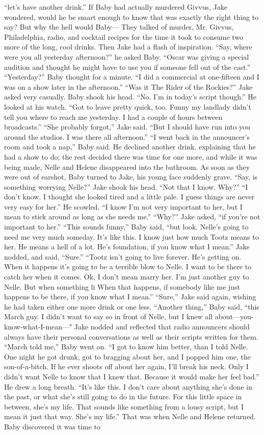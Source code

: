 \documentclass{novel}
\begin{document}
“let’s have another drink.” If Baby had actually murdered Givvus, Jake wondered, would he be smart enough to know that was exactly the right thing to say? But why the hell would Baby— They talked of murder, Mr. Givvus, Philadelphia, radio, and cocktail recipes for the time it took to consume two more of the long, cool drinks. Then Jake had a flash of inspiration. “Say, where were you all yesterday afternoon?” he asked Baby. “Oscar was giving a special audition and thought he might have to use you if someone fell out of the cast.” “Yesterday?” Baby thought for a minute. “I did a commercial at one-fifteen and I was on a show later in the afternoon.” “Was it The Rider of the Rockies?” Jake asked very casually. Baby shook his head. “No. I’m in today’s script though.” He looked at his watch. “Got to leave pretty quick, too. Funny my landlady didn’t tell you where to reach me yesterday. I had a couple of hours between broadcasts.” “She probably forgot,” Jake said. “But I should have run into you around the studios. I was there all afternoon.” “I went back in the announcer’s room and took a nap,” Baby said. He declined another drink, explaining that he had a show to do; the rest decided there was time for one more, and while it was being made, Nelle and Helene disappeared into the bathroom. As soon as they were out of earshot, Baby turned to Jake, his young face suddenly grave. “Say, is something worrying Nelle?” Jake shook his head. “Not that I know. Why?” “I don’t know. I thought she looked tired and a little pale. I guess things are never very easy for her.” He scowled. “I know I’m not very important to her, but I mean to stick around as long as she needs me.” “Why?” Jake asked, “if you’re not important to her.” “This sounds funny,” Baby said, “but look. Nelle’s going to need me very much someday. It’s like this. I know just how much Tootz means to her. He means a hell of a lot. He’s foundation, if you know what I mean.” Jake nodded, and said, “Sure.” “Tootz isn’t going to live forever. He’s getting on. When it happens it’s going to be a terrible blow to Nelle. I want to be there to catch her when it comes. Ok, I don’t mean marry her. I’m just another guy to Nelle. But when something li When that happens, if somebody like me just happens to be there, if you know what I mean.” “Sure,” Jake said again, wishing he had taken either one more drink or one less. “Another thing,” Baby said, “this March guy. I didn’t want to say so in front of Nelle, but I knew all about—you-know-what-I-mean—" Jake nodded and reflected that radio announcers should always have their personal conversations as well as their scripts written for them. “March told me,” Baby went on. “I got to know him better, than I told Nelle. One night he got drunk, got to bragging about her, and I popped him one, the son-of-a-bitch. If he ever shoots off about her again, I'll break his neck. Only I didn’t want Nelle to know that I knew that. Because it would make her feel bad.” He drew a long breath. “It’s like this. I don’t care about anything she’s done in the past, or what she’s still going to do in the future. For this little space in between, she’s my life. That sounds like something from a lousy script, but I mean it just that way. She’s my life.” That was when Nelle and Helene returned. Baby discovered it was time to 
\end{document}
